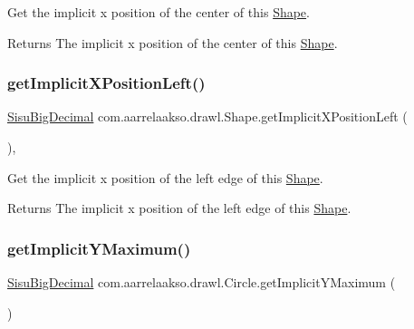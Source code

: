 Get the implicit x position of the center of this \hyperlink{classcom_1_1aarrelaakso_1_1drawl_1_1_shape}{Shape}.

\begin{DoxyReturn}{Returns}
The implicit x position of the center of this \hyperlink{classcom_1_1aarrelaakso_1_1drawl_1_1_shape}{Shape}. 
\end{DoxyReturn}
\mbox{\label{classcom_1_1aarrelaakso_1_1drawl_1_1_shape_ad9b2aee9937d5f034f7f4a2a1d979260}} 
\subsubsection{\texorpdfstring{get\+Implicit\+X\+Position\+Left()}{getImplicitXPositionLeft()}}
{\footnotesize\ttfamily \hyperlink{classcom_1_1aarrelaakso_1_1drawl_1_1_sisu_big_decimal}{Sisu\+Big\+Decimal} com.\+aarrelaakso.\+drawl.\+Shape.\+get\+Implicit\+X\+Position\+Left (\begin{DoxyParamCaption}{ }\end{DoxyParamCaption})\hspace{0.3cm}{\ttfamily [protected]}, {\ttfamily [inherited]}}

Get the implicit x position of the left edge of this \hyperlink{classcom_1_1aarrelaakso_1_1drawl_1_1_shape}{Shape}.

\begin{DoxyReturn}{Returns}
The implicit x position of the left edge of this \hyperlink{classcom_1_1aarrelaakso_1_1drawl_1_1_shape}{Shape}. 
\end{DoxyReturn}
\mbox{\label{classcom_1_1aarrelaakso_1_1drawl_1_1_circle_a69c8084493cd0d4c899235c171fe127e}} 
\subsubsection{\texorpdfstring{get\+Implicit\+Y\+Maximum()}{getImplicitYMaximum()}}
{\footnotesize\ttfamily \hyperlink{classcom_1_1aarrelaakso_1_1drawl_1_1_sisu_big_decimal}{Sisu\+Big\+Decimal} com.\+aarrelaakso.\+drawl.\+Circle.\+get\+Implicit\+Y\+Maximum (\begin{DoxyParamCaption}{ }\end{DoxyParamCaption})\hspace{0.3cm}{\ttfamily [protected]}}

